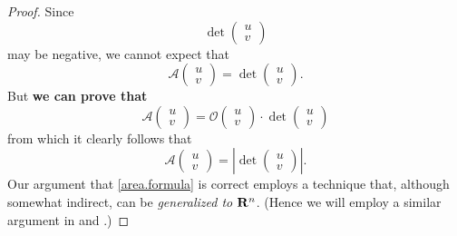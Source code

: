 \begin{proof}
Since
\[
    \det \begin{pmatrix} u \\ v \end{pmatrix}
\]
may be negative, we cannot expect that
\[
    \mathcal{A}\begin{pmatrix} u \\ v \end{pmatrix} = \det \begin{pmatrix} u \\ v \end{pmatrix}.
\]
But \textbf{we can prove that}
\begin{equation} \label{area.formula}
    \mathcal{A}\begin{pmatrix} u \\ v \end{pmatrix} = \mathcal{O}\begin{pmatrix} u \\ v \end{pmatrix} \cdot \det \begin{pmatrix} u \\ v \end{pmatrix}
\end{equation}
from which it clearly follows that
\begin{equation} \label{simplified.area.formula}
    \mathcal{A}\begin{pmatrix} u \\ v \end{pmatrix} = \left| \det \begin{pmatrix} u \\ v \end{pmatrix} \right|.
\end{equation}
Our argument that \ref{area.formula} is correct employs a technique that, although somewhat indirect, can be \emph{generalized to \(\mathbf{R}^n\)}.
(Hence we will employ a similar argument in  and .)


\end{proof}

